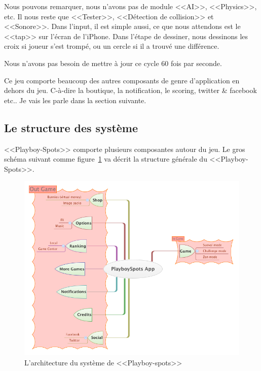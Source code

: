 Nous pouvons remarquer, nous n'avons pas de module <<AI>>, <<Physics>>, etc. Il nous reste que <<Tester>>, <<Détection de collision>> et <<Sonore>>. Dans l'input, il est simple aussi, ce que nous attendons est le <<tap>> sur l'écran de l'iPhone. Dans l'étape de dessiner, nous dessinons les croix si joueur s'est trompé, ou un cercle si il a trouvé une différence.

Nous n'avons pas besoin de mettre à jour ce cycle 60 fois par seconde. 

Ce jeu comporte beaucoup des autres composants de genre d'application en dehors du jeu. C-à-dire la boutique, la notification, le scoring, twitter \& facebook etc..
Je vais les parle dans la section suivante.


\subsection{Le structure des système} %

<<Playboy-Spots>> comporte plusieurs composantes autour du jeu. Le gros schéma suivant comme figure~\ref{fig:XMinds_PlayboySpotsApp} va décrit la structure générale du <<Playboy-Spots>>.
\begin{figure}[htbp]
	\centering
		\includegraphics[width=6in]{XMinds/PlayboySpotsApp.png}
	\caption{L'architecture du système de <<Playboy-spots>>}
	\label{fig:XMinds_PlayboySpotsApp}
\end{figure}



